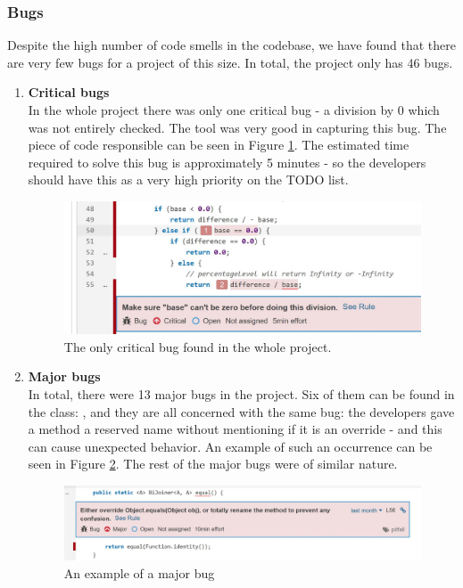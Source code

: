         \subsubsection{Bugs}
            Despite the high number of code smells in the codebase, we have found that there are very few bugs for a project of this size. In total, the project only has 46 bugs.
            \begin{enumerate}
                \item \textbf{Critical bugs}\\
                In the whole project there was only one critical bug - a division by 0 which was not entirely checked. The tool was very good in capturing this bug. The piece of code responsible can be seen in Figure \ref{fig:criticalbug}. The estimated time required to solve this bug is approximately 5 minutes - so the developers should have this as a very high priority on the TODO list.
                \begin{figure}[H]
                    \centering
                    \includegraphics[scale=0.8]{figures/criticalbug.JPG}
                    \caption{The only critical bug found in the whole project.}
                    \label{fig:criticalbug}
                \end{figure}
                
                \item \textbf{Major bugs}\\
                In total, there were 13 major bugs in the project. Six of them can be found in the class: , and they are all concerned with the same bug: the developers gave a method a reserved name without mentioning if it is an override - and this can cause unexpected behavior. An example of such an occurrence can be seen in Figure \ref{fig:majorbug}. The rest of the major bugs were of similar nature.
                \begin{figure}[H]
                    \centering
                    \includegraphics[scale=0.8]{figures/majorbug.JPG}
                    \caption{An example of a major bug}
                    \label{fig:majorbug}
                \end{figure}
                

\end{enumerate}

